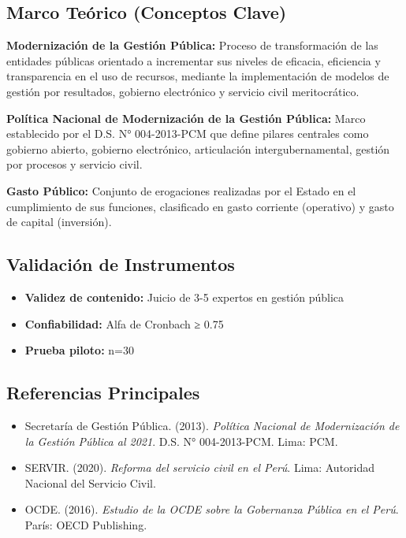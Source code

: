 \documentclass[
  man,
  floatsintext,
  longtable,
  a4paper,
  nolmodern,
  notxfonts,
  notimes,
  12pt,
  colorlinks=true,linkcolor=blue,citecolor=blue,urlcolor=blue]{apa7}
\providecommand{\tightlist}{%
  \setlength{\itemsep}{0pt}\setlength{\parskip}{0pt}}
\begin{document}
\subsection{Marco Teórico (Conceptos
Clave)}\label{marco-teuxf3rico-conceptos-clave-8}

\textbf{Modernización de la Gestión Pública:} Proceso de transformación
de las entidades públicas orientado a incrementar sus niveles de
eficacia, eficiencia y transparencia en el uso de recursos, mediante la
implementación de modelos de gestión por resultados, gobierno
electrónico y servicio civil meritocrático.

\textbf{Política Nacional de Modernización de la Gestión Pública:} Marco
establecido por el D.S. N° 004-2013-PCM que define pilares centrales
como gobierno abierto, gobierno electrónico, articulación
intergubernamental, gestión por procesos y servicio civil.

\textbf{Gasto Público:} Conjunto de erogaciones realizadas por el Estado
en el cumplimiento de sus funciones, clasificado en gasto corriente
(operativo) y gasto de capital (inversión).

\subsection{Validación de
Instrumentos}\label{validaciuxf3n-de-instrumentos-2}

\begin{itemize}
\tightlist
\item
  \textbf{Validez de contenido:} Juicio de 3-5 expertos en gestión
  pública
\item
  \textbf{Confiabilidad:} Alfa de Cronbach ≥ 0.75
\item
  \textbf{Prueba piloto:} n=30
\end{itemize}

\subsection{Referencias Principales}\label{referencias-principales-8}

\begin{itemize}
\tightlist
\item
  Secretaría de Gestión Pública. (2013). \emph{Política Nacional de
  Modernización de la Gestión Pública al 2021}. D.S. N° 004-2013-PCM.
  Lima: PCM.
\item
  SERVIR. (2020). \emph{Reforma del servicio civil en el Perú}. Lima:
  Autoridad Nacional del Servicio Civil.
\item
  OCDE. (2016). \emph{Estudio de la OCDE sobre la Gobernanza Pública en
  el Perú}. París: OECD Publishing.
\end{itemize}
\end{document}
